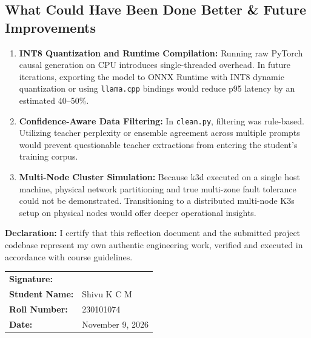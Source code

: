 \documentclass[11pt,a4paper]{article}
\begin{document}
\subsection*{What Could Have Been Done Better \& Future Improvements}
\begin{enumerate}
    \item \textbf{INT8 Quantization and Runtime Compilation:} Running raw PyTorch causal generation on CPU introduces single-threaded overhead. In future iterations, exporting the model to ONNX Runtime with INT8 dynamic quantization or using \texttt{llama.cpp} bindings would reduce p95 latency by an estimated 40--50\%.
    \item \textbf{Confidence-Aware Data Filtering:} In \texttt{clean.py}, filtering was rule-based. Utilizing teacher perplexity or ensemble agreement across multiple prompts would prevent questionable teacher extractions from entering the student's training corpus.
    \item \textbf{Multi-Node Cluster Simulation:} Because k3d executed on a single host machine, physical network partitioning and true multi-zone fault tolerance could not be demonstrated. Transitioning to a distributed multi-node K3s setup on physical nodes would offer deeper operational insights.
\end{enumerate}

\vspace{1.5em}
\noindent\textbf{Declaration:} I certify that this reflection document and the submitted project codebase represent my own authentic engineering work, verified and executed in accordance with course guidelines.

\vspace{2.5em}
\noindent\begin{tabular}{ll}
\textbf{Signature:} & \underline{\hspace{5cm}} \\
\textbf{Student Name:} & Shivu K C M \\
\textbf{Roll Number:} & 230101074 \\
\textbf{Date:} & November 9, 2026
\end{tabular}
\end{document}
